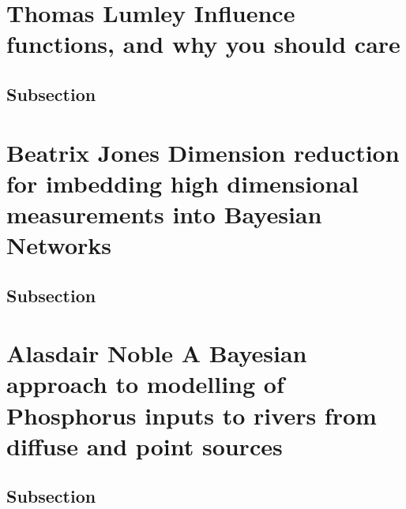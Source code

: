 \documentclass[
]{book}
\begin{document}
\hypertarget{thomas-lumley-influence-functions-and-why-you-should-care}{%
\chapter*{Thomas Lumley \textbar{} Influence functions, and why you should care}\label{thomas-lumley-influence-functions-and-why-you-should-care}}

\hypertarget{subsection}{%
\section{Subsection}\label{subsection}}

\hypertarget{beatrix-jones-dimension-reduction-for-imbedding-high-dimensional-measurements-into-bayesian-networks}{%
\chapter*{Beatrix Jones \textbar{} Dimension reduction for imbedding high dimensional measurements into Bayesian Networks}\label{beatrix-jones-dimension-reduction-for-imbedding-high-dimensional-measurements-into-bayesian-networks}}

\hypertarget{subsection}{%
\section{Subsection}\label{subsection}}

\hypertarget{alasdair-noble-a-bayesian-approach-to-modelling-of-phosphorus-inputs-to-rivers-from-diffuse-and-point-sources}{%
\chapter*{Alasdair Noble\textbar{} A Bayesian approach to modelling of Phosphorus inputs to rivers from diffuse and point sources}\label{alasdair-noble-a-bayesian-approach-to-modelling-of-phosphorus-inputs-to-rivers-from-diffuse-and-point-sources}}

\hypertarget{subsection}{%
\section{Subsection}\label{subsection}}
\end{document}
